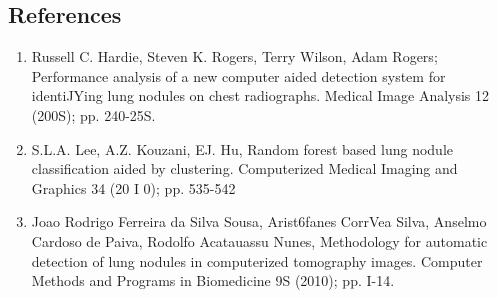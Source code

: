 \documentclass[hidelinks,12pt,xcolor=table]{article}
\begin{document}
\begin{multicols}{2}
\section{References}
\begin{enumerate}
\item Russell C. Hardie, Steven K. Rogers, Terry Wilson, Adam Rogers;
Performance analysis of a new computer aided detection system for
identiJYing lung nodules on chest radiographs. Medical Image
Analysis 12 (200S); pp. 240-25S.

\item S.L.A. Lee, A.Z. Kouzani, EJ. Hu, Random forest based lung nodule
classification aided by clustering. Computerized Medical Imaging and
Graphics 34 (20 I 0); pp. 535-542

\item Joao Rodrigo Ferreira da Silva Sousa, Arist6fanes CorrVea Silva,
Anselmo Cardoso de Paiva, Rodolfo Acatauassu Nunes, Methodology
for automatic detection of lung nodules in computerized tomography
images. Computer Methods and Programs in Biomedicine 9S (2010);
pp. I-14.















\end{enumerate}
\end{multicols}
\end{document}
